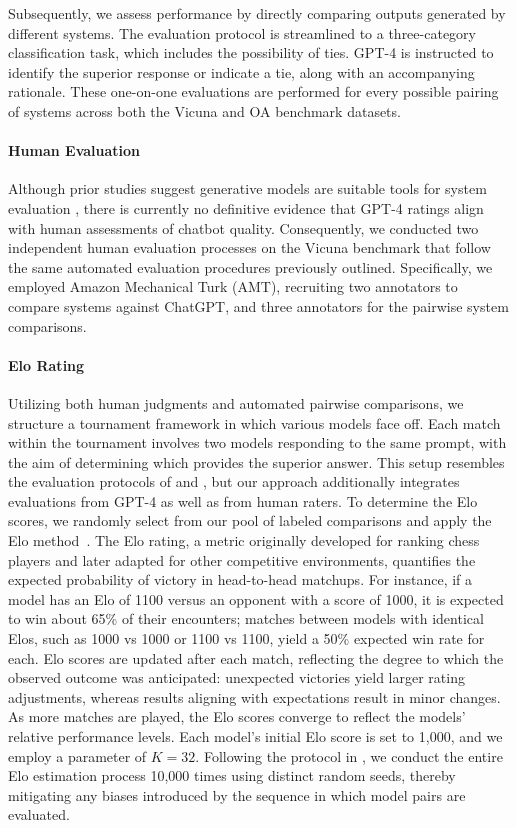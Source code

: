 Subsequently, we assess performance by directly comparing outputs generated by different systems. The evaluation protocol is streamlined to a three-category classification task, which includes the possibility of ties. GPT-4 is instructed to identify the superior response or indicate a tie, along with an accompanying rationale. These one-on-one evaluations are performed for every possible pairing of systems across both the Vicuna and OA benchmark datasets.

\paragraph{Human Evaluation} Although prior studies suggest generative models are suitable tools for system evaluation \citep{fu2023gptscore}, there is currently no definitive evidence that GPT-4 ratings align with human assessments of chatbot quality. Consequently, we conducted two independent human evaluation processes on the Vicuna benchmark that follow the same automated evaluation procedures previously outlined. Specifically, we employed Amazon Mechanical Turk (AMT), recruiting two annotators to compare systems against ChatGPT, and three annotators for the pairwise system comparisons.

\paragraph{Elo Rating} Utilizing both human judgments and automated pairwise comparisons, we structure a tournament framework in which various models face off. Each match within the tournament involves two models responding to the same prompt, with the aim of determining which provides the superior answer. This setup resembles the evaluation protocols of \citet{bai2022training} and \citet{vicuna2023}, but our approach additionally integrates evaluations from GPT-4 as well as from human raters. To determine the Elo scores, we randomly select from our pool of labeled comparisons and apply the Elo method~\citep{elo1967proposed,elo1978rating}. The Elo rating, a metric originally developed for ranking chess players and later adapted for other competitive environments, quantifies the expected probability of victory in head-to-head matchups. For instance, if a model has an Elo of 1100 versus an opponent with a score of 1000, it is expected to win about 65\% of their encounters; matches between models with identical Elos, such as 1000 vs 1000 or 1100 vs 1100, yield a 50\% expected win rate for each. Elo scores are updated after each match, reflecting the degree to which the observed outcome was anticipated: unexpected victories yield larger rating adjustments, whereas results aligning with expectations result in minor changes. As more matches are played, the Elo scores converge to reflect the models' relative performance levels. Each model's initial Elo score is set to 1,000, and we employ a parameter of $K=32$. Following the protocol in \citet{vicuna2023}, we conduct the entire Elo estimation process 10,000 times using distinct random seeds, thereby mitigating any biases introduced by the sequence in which model pairs are evaluated.

